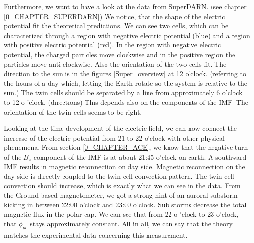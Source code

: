 \documentclass[10pt,a4paper]{article}
\begin{document}
Furthermore, we want to have a look at the data from SuperDARN. (see chapter \ref{0_CHAPTER_SUPERDARN}) We notice, that the shape of the electric potential fit the theoretical predictions. We can see two cells, which can be characterized through a region with negative electric potential (blue) and a region with positive electric 
potential (red). In the region with negative electric potential, the charged particles move clockwise and in the positive region the particles move anti-clockwise. 
Also the orientation of the two cells fit. The direction to the sun is in the figures \ref{Super_overview} at 12 o'clock. 
(referring to the hours of a day which, letting the Earth rotate so the system is relative to the sun.) The twin cells should be separated by a line from approximately  6 o'clock to 12 o 'clock. (directions) This depends also on the components of the IMF. The orientation of the twin cells seems to be right.  

Looking at the time development of the electric field, we can now connect the increase of the electric potential from 21 to 22 o'clock with other physical phenomena. 
From section \ref{0_CHAPTER_ACE}, we know that the negative turn of the $B_z$ component of the IMF is at about 21:45 o'clock on earth. A southward IMF results in 
magnetic reconnection on day side. Magnetic reconnection on the day side is directly coupled to the twin-cell convection pattern. The twin cell convection should increase,
which is exactly what we can see in the data. From the Ground-based magnetometer, we got a strong  hint of an auroral substorm kicking in between 22:00 o'clock and 
23:00 o'clock. Sub storms decrease the total magnetic flux in the polar cap. We can see that from 22 o 'clock to 23 o'clock, that $\phi_{pc}$ stays approximately constant.
All in all, we can say that the theory matches the experimental data concerning this measurement. 
\end{document}
